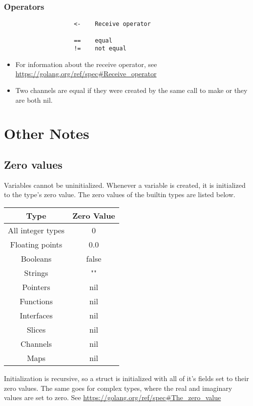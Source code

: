 \documentclass{article}
\begin{document}
		\subsubsection{Operators}
			\begin{verbatim}
				    <-    Receive operator
				    
				    ==    equal
				    !=    not equal
			\end{verbatim}
			\begin{itemize}
				\item For information about the receive operator, see \url{https://golang.org/ref/spec#Receive_operator}
				\item Two channels are equal if they were created by the same call to \colorbox{code}{make} or they are both \colorbox{code}{nil}.
			\end{itemize}
	
\section{Other Notes}
	\subsection{Zero values}
		Variables cannot be uninitialized. Whenever a variable is created, it is initialized to the type's zero value. The zero values of the builtin types are listed below. 
		\begin{center}
			\begin{tabular}{ | c | c | }
			\hline
 			Type & Zero Value  \\ 
			\hline
 			All integer types & 0  \\  
 			Floating points & 0.0   \\
			Booleans & false \\
			Strings & "" \\
			Pointers & nil \\
			Functions & nil \\
			Interfaces & nil \\
			Slices & nil \\
			Channels & nil \\
			Maps & nil \\
			\hline
			\end{tabular}
		\end{center}
		Initialization is recursive, so a struct is initialized with all of it's fields set to their zero values. The same goes for complex types, where the real and imaginary values are set to zero.
		See \url{https://golang.org/ref/spec#The_zero_value}	
		
\end{document}
